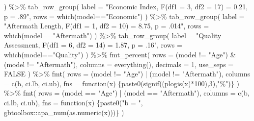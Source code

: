 \documentclass[
  letterpaper,
  DIV=11,
  numbers=noendperiod]{scrartcl}
\newenvironment{Shaded}{\begin{snugshade}}{\end{snugshade}}
\newcommand{\AttributeTok}[1]{\textcolor[rgb]{0.40,0.45,0.13}{#1}}
\newcommand{\ConstantTok}[1]{\textcolor[rgb]{0.56,0.35,0.01}{#1}}
\newcommand{\ControlFlowTok}[1]{\textcolor[rgb]{0.00,0.23,0.31}{#1}}
\newcommand{\DecValTok}[1]{\textcolor[rgb]{0.68,0.00,0.00}{#1}}
\newcommand{\FunctionTok}[1]{\textcolor[rgb]{0.28,0.35,0.67}{#1}}
\newcommand{\NormalTok}[1]{\textcolor[rgb]{0.00,0.23,0.31}{#1}}
\newcommand{\SpecialCharTok}[1]{\textcolor[rgb]{0.37,0.37,0.37}{#1}}
\newcommand{\StringTok}[1]{\textcolor[rgb]{0.13,0.47,0.30}{#1}}
\begin{document}
\begin{Shaded}
\begin{Highlighting}[]
\NormalTok{  ) }\SpecialCharTok{\%\textgreater{}\%}
    \FunctionTok{tab\_row\_group}\NormalTok{(}
    \AttributeTok{label =} \StringTok{"Economic Index, F(df1 = 3, df2 = 17) = 0.21, p = .89"}\NormalTok{,}
    \AttributeTok{rows =} \FunctionTok{which}\NormalTok{(model}\SpecialCharTok{==}\StringTok{"Economic"}\NormalTok{)}
\NormalTok{  ) }\SpecialCharTok{\%\textgreater{}\%}
    \FunctionTok{tab\_row\_group}\NormalTok{(}
    \AttributeTok{label =} \StringTok{"Aftermath Length, F(df1 = 1, df2 = 10) = 8.75, p = .014"}\NormalTok{,}
    \AttributeTok{rows =} \FunctionTok{which}\NormalTok{(model}\SpecialCharTok{==}\StringTok{"Aftermath"}\NormalTok{)}
\NormalTok{  ) }\SpecialCharTok{\%\textgreater{}\%}
  \FunctionTok{tab\_row\_group}\NormalTok{(}
    \AttributeTok{label =} \StringTok{"Quality Assessment, F(df1 = 6, df2 = 14) = 1.87, p = .16"}\NormalTok{,}
    \AttributeTok{rows =} \FunctionTok{which}\NormalTok{(model}\SpecialCharTok{==}\StringTok{"Quality"}\NormalTok{)}
\NormalTok{  ) }\SpecialCharTok{\%\textgreater{}\%}
   \FunctionTok{fmt\_percent}\NormalTok{(}
    \AttributeTok{rows     =}\NormalTok{ (model }\SpecialCharTok{!=} \StringTok{"Age"}\NormalTok{) }\SpecialCharTok{\&}\NormalTok{ (model }\SpecialCharTok{!=} \StringTok{"Aftermath"}\NormalTok{),}
    \AttributeTok{columns  =} \FunctionTok{everything}\NormalTok{(),}
    \AttributeTok{decimals =} \DecValTok{1}\NormalTok{,}
    \AttributeTok{use\_seps =} \ConstantTok{FALSE}
\NormalTok{  ) }\SpecialCharTok{\%\textgreater{}\%}
  \FunctionTok{fmt}\NormalTok{(}
    \AttributeTok{rows     =}\NormalTok{ (model }\SpecialCharTok{!=} \StringTok{"Age"}\NormalTok{) }\SpecialCharTok{|}\NormalTok{ (model }\SpecialCharTok{!=} \StringTok{"Aftermath"}\NormalTok{),}
    \AttributeTok{columns  =} \FunctionTok{c}\NormalTok{(b, ci.lb, ci.ub),}
    \AttributeTok{fns      =} \ControlFlowTok{function}\NormalTok{(x) \{}\FunctionTok{paste0}\NormalTok{(}\FunctionTok{signif}\NormalTok{((}\FunctionTok{plogis}\NormalTok{(x)}\SpecialCharTok{*}\DecValTok{100}\NormalTok{),}\DecValTok{3}\NormalTok{),}\StringTok{"\%"}\NormalTok{)\}}
\NormalTok{  ) }\SpecialCharTok{\%\textgreater{}\%}
   \FunctionTok{fmt}\NormalTok{(}
    \AttributeTok{rows     =}\NormalTok{ (model }\SpecialCharTok{==} \StringTok{"Age"}\NormalTok{) }\SpecialCharTok{|}\NormalTok{ (model }\SpecialCharTok{==} \StringTok{"Aftermath"}\NormalTok{),}
    \AttributeTok{columns  =} \FunctionTok{c}\NormalTok{(b, ci.lb, ci.ub),}
    \AttributeTok{fns      =} \ControlFlowTok{function}\NormalTok{(x) \{}\FunctionTok{paste0}\NormalTok{(}\StringTok{"b = "}\NormalTok{, gbtoolbox}\SpecialCharTok{::}\FunctionTok{apa\_num}\NormalTok{(}\FunctionTok{as.numeric}\NormalTok{(x)))\}}
\NormalTok{  )}
\end{Highlighting}
\end{Shaded}
\end{document}
